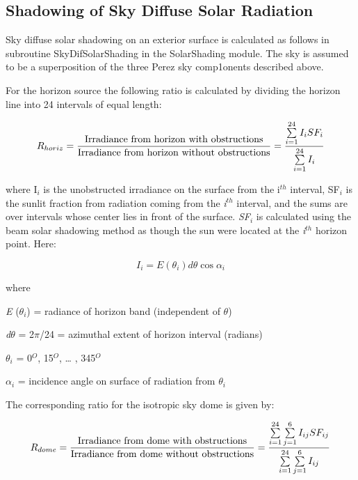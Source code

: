 \subsection{Shadowing of Sky Diffuse Solar Radiation}\label{shadowing-of-sky-diffuse-solar-radiation}

Sky diffuse solar shadowing on an exterior surface is calculated as follows in subroutine SkyDifSolarShading in the SolarShading module. The sky is assumed to be a superposition of the three Perez sky comp1onents described above.

For the horizon source the following ratio is calculated by dividing the horizon line into 24 intervals of equal length:

\begin{equation}
{R_{horiz}} = \frac{{{\rm{Irradiance~from~horizon~with~obstructions}}}}{{{\rm{Irradiance~from~horizon~without~obstructions}}}} = \frac{{\sum\limits_{i = 1}^{24} {{I_i}S{F_i}} }}{{\sum\limits_{i = 1}^{24} {{I_i}} }}
\end{equation}

where I\(_{i}\) is the unobstructed irradiance on the surface from the i\(^{th}\) interval, SF\(_{i}\) is the sunlit fraction from radiation coming from the \emph{i}\(^{th}\) interval, and the sums are over intervals whose center lies in front of the surface. \emph{SF\(_{i}\)} is calculated using the beam solar shadowing method as though the sun were located at the \emph{i}\(^{th}\) horizon point. Here:

\begin{equation}
{I_i} = E({\theta_i})d\theta \cos {\alpha_i}
\end{equation}

where

\emph{E} (\emph{$\theta$\(_{i}\)}) = radiance of horizon band (independent of $\theta$)

\emph{d$\theta$} = 2$\pi$/24 = azimuthal extent of horizon interval (radians)

\emph{$\theta$\(_{i}\)} = 0\(^{O}\), 15\(^{O}\), \ldots{} , 345\(^{O}\)

$\alpha$\(_{i}\) = incidence angle on surface of radiation from \emph{$\theta$\(_{i}\)}

The corresponding ratio for the isotropic sky dome is given by:

\begin{equation}
{R_{dome}} = \frac{{{\rm{Irradiance~from~dome~with~obstructions}}}}{{{\rm{Irradiance~from~dome~without~obstructions}}}} = \frac{{\sum\limits_{i = 1}^{24} {\sum\limits_{j = 1}^6 {{I_{ij}}S{F_{ij}}} } }}{{\sum\limits_{i = 1}^{24} {\sum\limits_{j = 1}^6 {{I_{ij}}} } }}
\end{equation}


